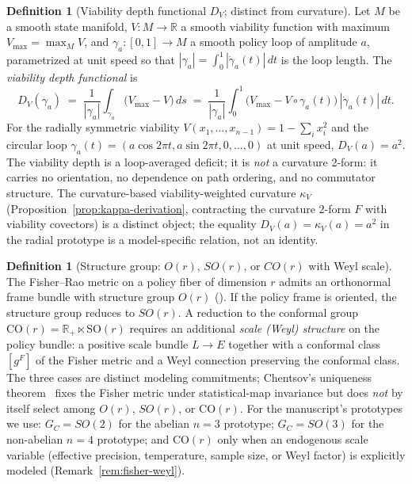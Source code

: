 \documentclass[11pt,a4paper]{article}
\theoremstyle{plain}
\theoremstyle{definition}
\newtheorem{definition}[theorem]{Definition}
\theoremstyle{remark}
\newcommand{\kk}{\kappa_{\!V}}
\newcommand{\RR}{\mathbb{R}}
\newcommand{\SO}{\mathrm{SO}}
\newcommand{\CO}{\mathrm{CO}}
\begin{document}
\begin{definition}[Viability depth functional $D_V$; distinct from curvature]
\label{def:kappa-depth}
Let $M$ be a smooth state manifold, $V:M\to\RR$ a smooth viability
function with maximum $V_{\max}=\max_M V$, and $\gamma_a:[0,1]\to M$ a
smooth policy loop of amplitude $a$, parametrized at unit speed so that
$|\gamma_a| = \int_0^1|\dot\gamma_a(t)|\,dt$ is the loop length. The
\emph{viability depth functional} is
\begin{equation}\label{eq:DV}
  D_V(\gamma_a) \;=\; \frac{1}{|\gamma_a|}\int_{\gamma_a}\!\bigl(V_{\max}-V\bigr)\,ds
  \;=\; \frac{1}{|\gamma_a|}\int_0^1\!\bigl(V_{\max}-V\circ\gamma_a(t)\bigr)\,|\dot\gamma_a(t)|\,dt.
\end{equation}
For the radially symmetric viability $V(x_1,\ldots,x_{n-1}) = 1 - \sum_i
x_i^2$ and the circular loop $\gamma_a(t) = (a\cos 2\pi t, a\sin 2\pi t,
0,\ldots,0)$ at unit speed, $D_V(a) = a^2$. The viability depth is a
loop-averaged deficit; it is \emph{not} a curvature 2-form: it carries
no orientation, no dependence on path ordering, and no commutator
structure. The curvature-based viability-weighted curvature $\kk$
(Proposition~\ref{prop:kappa-derivation}, contracting the curvature
$2$-form $F$ with viability covectors) is a distinct object; the
equality $D_V(a) = \kk(a) = a^2$ in the radial prototype is a
model-specific relation, not an identity.
\end{definition}

\begin{definition}[Structure group: $O(r)$, $SO(r)$, or $CO(r)$ with Weyl scale]
\label{def:struct}
The Fisher--Rao metric on a policy fiber of dimension $r$ admits an
orthonormal frame bundle with structure group $O(r)$
(\cite{kobayashinomizu1969,amari2000}). If the policy frame is
oriented, the structure group reduces to $SO(r)$. A reduction to the
conformal group $\CO(r) = \RR_+ \ltimes \SO(r)$ requires an additional
\emph{scale (Weyl) structure} on the policy bundle: a positive scale
bundle $L \to E$ together with a conformal class $[g^F]$ of the
Fisher metric and a Weyl connection preserving the conformal class.
The three cases are distinct modeling commitments; Chentsov's
uniqueness theorem~\cite{chentsov1982} fixes the Fisher metric under
statistical-map invariance but does \emph{not} by itself select among
$O(r)$, $SO(r)$, or $\CO(r)$. For the manuscript's prototypes we use:
$G_C = SO(2)$ for the abelian $n=3$ prototype; $G_C = SO(3)$ for the
non-abelian $n=4$ prototype; and $\CO(r)$ only when an endogenous
scale variable (effective precision, temperature, sample size, or
Weyl factor) is explicitly modeled (Remark~\ref{rem:fisher-weyl}).
\end{definition}
\end{document}
